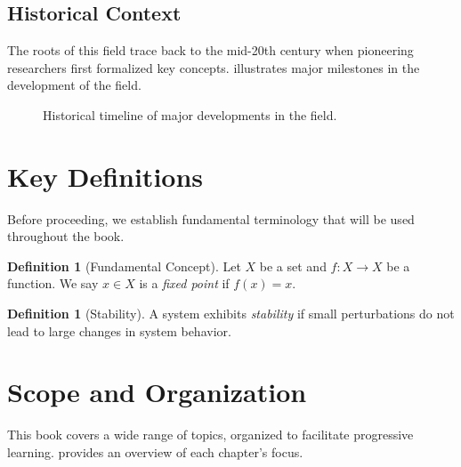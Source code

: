 \documentclass[11pt,twoside,openright]{book}
\theoremstyle{plain}
\theoremstyle{definition}
\newtheorem{definition}[theorem]{Definition}
\theoremstyle{remark}
\begin{document}
\subsection{Historical Context}
\label{subsec:intro-history}

The roots of this field trace back to the mid-20th century when pioneering researchers first formalized key concepts.  illustrates major milestones in the development of the field.

\begin{figure}[tbp]
    \centering
    \caption{Historical timeline of major developments in the field.}
    \label{fig:timeline}
\end{figure}

\section{Key Definitions}
\label{sec:intro-definitions}

Before proceeding, we establish fundamental terminology that will be used throughout the book.

\begin{definition}[Fundamental Concept]
\label{def:fundamental}
Let $X$ be a set and $f\colon X \to X$ be a function. We say $x \in X$ is a \emph{fixed point} if $f(x) = x$.
\end{definition}

\begin{definition}[Stability]
\label{def:stability}
A system exhibits \emph{stability} if small perturbations do not lead to large changes in system behavior.
\end{definition}

\section{Scope and Organization}
\label{sec:intro-scope}

This book covers a wide range of topics, organized to facilitate progressive learning.  provides an overview of each chapter's focus.
\end{document}
